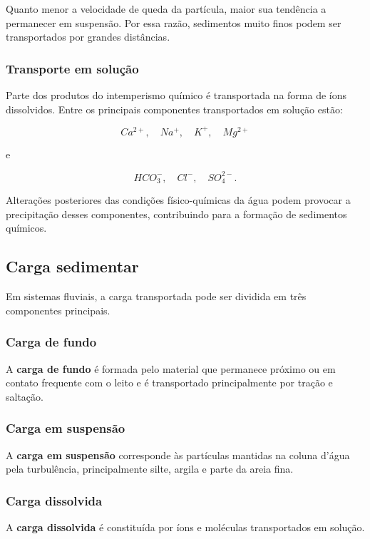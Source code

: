 \documentclass[a4paper,12pt]{article}
\theoremstyle{definition}
\theoremstyle{definition}
\theoremstyle{definition}
\begin{document}
Quanto menor a velocidade de queda da partícula, maior sua tendência a
permanecer em suspensão. Por essa razão, sedimentos muito finos podem ser
transportados por grandes distâncias.

\subsubsection{Transporte em solução}

Parte dos produtos do intemperismo químico é transportada na forma de íons
dissolvidos. Entre os principais componentes transportados em solução estão:

\[
Ca^{2+}, \quad Na^+, \quad K^+, \quad Mg^{2+}
\]

e

\[
HCO_3^-, \quad Cl^-, \quad SO_4^{2-}.
\]

Alterações posteriores das condições físico-químicas da água podem provocar a
precipitação desses componentes, contribuindo para a formação de sedimentos
químicos.

\subsection{Carga sedimentar}

Em sistemas fluviais, a carga transportada pode ser dividida em três componentes
principais.

\subsubsection{Carga de fundo}

A \textbf{carga de fundo} é formada pelo material que permanece próximo ou em
contato frequente com o leito e é transportado principalmente por tração e
saltação.

\subsubsection{Carga em suspensão}

A \textbf{carga em suspensão} corresponde às partículas mantidas na coluna
d'água pela turbulência, principalmente silte, argila e parte da areia fina.

\subsubsection{Carga dissolvida}

A \textbf{carga dissolvida} é constituída por íons e moléculas transportados em
solução.
\end{document}
